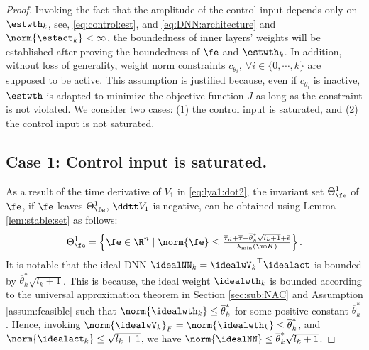 \documentclass[journal]{IEEEtran}
\begin{document}
\begin{proof}

Invoking the fact that the amplitude of the control input depends only on $\estwth_k$, \ie see, \eqref{eq:control:est}, and \eqref{eq:DNN:architecture} and $\norm{\estact_k}<\infty$, 
the boundedness of inner layers' weights will be established after proving the boundedness of $\fe$ and $\estwth_k$.
In addition, without loss of generality, weight norm constraints $c_{\theta_i},\ \forall i\in\{0,\cdots,k\}$ are supposed to be active.
This assumption is justified because, even if $c_{\theta_i}$ is inactive, $\estwth$ is adapted to minimize the objective function $J$ as long as the constraint is not violated.
We consider two cases: (1) the control input is saturated, and (2) the control input is not saturated.

\subsection*{Case 1: Control input is saturated.}

As a result of the time derivative of $V_1$ in \eqref{eq:lya1:dot2}, the invariant set $\Theta_{\fe}^{1}$ of $\fe$, \ie if $\fe$ leaves $\Theta_{\fe}^{1}$, $\ddtt V_1$ is negative, can be obtained using Lemma \ref{lem:stable:set} as follows:
\begin{equation}
    \Theta_{\fe}^{1} 
    = 
    \left\{ 
        \fe \in \R^n 
        \mid 
        \norm{\fe} 
        \le 
        \tfrac{
            \overline\tau_d
            +
            \overline\tau
            +
            \overline{\theta}_k^*\sqrt{l_{k}+1}
            +
            \overline{\epsilon}
        }{
            \lambda_{\min}(\mm K)
        }
    \right\}
    .
    \label{eq:invariant:c1:fe}
\end{equation}
It is notable that the ideal DNN $\idealNN_k={\idealwV_k}^\top\idealact$ is bounded by $\overline{\theta}_k^*\sqrt{l_{k}+1}$.
This is because, the ideal weight $\idealwth_k$ is bounded according to the universal approximation theorem in Section \ref{sec:sub:NAC} and Assumption \ref{assum:feasible} such that $\norm{\idealwth_k}\le\overline{\theta}_k^*$ for some positive constant $\overline{\theta}_k^*$.
Hence, invoking $\norm{\idealwV_k}_F = \norm{\idealwth_k} \le \overline{\theta}_k^*$, and $\norm{\idealact_k}\le \sqrt{l_{k}+1}$, we have $\norm{\idealNN}\le \overline{\theta}_k^*\sqrt{l_{k}+1}$.


\end{proof}
\end{document}
